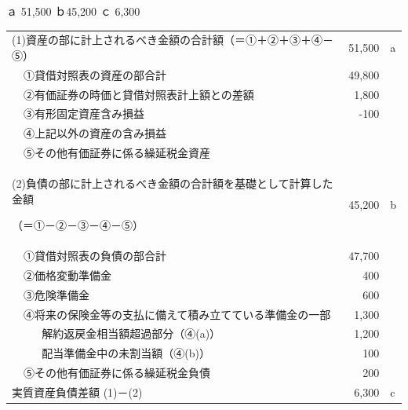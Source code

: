 \documentclass[report,gutter=10mm,fore-edge=10mm,uplatex,dvipdfmx]{jlreq}
\begin{document}
ａ 51,500
ｂ45,200
ｃ 6,300\\
\begin{tabular}{|l|l|l|r|l}
\cline{1-4}
\multicolumn{3}{|l|}{
(1)資産の部に計上されるべき金額の合計額（＝①＋②＋③＋④－⑤）} & 51,500 & a\\ \cline{2-4}
& \multicolumn{2}{l|}{①貸借対照表の資産の部合計} & 49,800 &\\ \cline{2-4}
& \multicolumn{2}{l|}{②有価証券の時価と貸借対照表計上額との差額} & 1,800 &\\ \cline{2-4}
& \multicolumn{2}{l|}{③有形固定資産含み損益} & -100 &\\ \cline{2-4}
& \multicolumn{2}{l|}{④上記以外の資産の含み損益} & &\\ \cline{2-4}
& \multicolumn{2}{l|}{⑤その他有価証券に係る繰延税金資産} & &\\ \cline{1-4}
\multicolumn{3}{|l|}{(2)負債の部に計上されるべき金額の合計額を基礎として計算した金額\par 
（＝①－②－③－④－⑤）} & 45,200& b\\ \cline{2-4}
& \multicolumn{2}{l|}{①貸借対照表の負債の部合計} & 47,700 &\\ \cline{2-4}
& \multicolumn{2}{l|}{②価格変動準備金} & 400 &\\ \cline{2-4}
& \multicolumn{2}{l|}{③危険準備金} & 600 &\\ \cline{2-4}
& \multicolumn{2}{l|}{④将来の保険金等の支払に備えて積み立てている準備金の一部} & 1,300 &\\ \cline{3-4}
&& 解約返戻金相当額超過部分（④(a)）& 1,200 &\\ \cline{3-4}
&& 配当準備金中の未割当額（④(b)）& 100 &\\ \cline{2-4}
& \multicolumn{2}{l|}{⑤その他有価証券に係る繰延税金負債} & 200 &\\ \cline{1-4}
\multicolumn{3}{|l|}{実質資産負債差額 (1)－(2)} & 6,300 & c\\ \cline{1-4}
\end{tabular}\\ \\ \\
\end{document}
